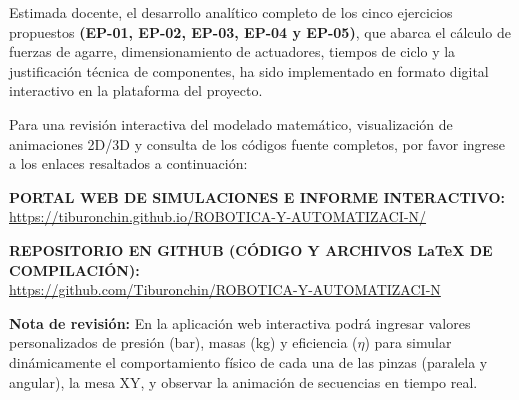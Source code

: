 \documentclass[12pt,a4paper]{article}
\begin{document}
\vspace{0.5cm}

Estimada docente, el desarrollo analítico completo de los cinco ejercicios propuestos \textbf{(EP-01, EP-02, EP-03, EP-04 y EP-05)}, que abarca el cálculo de fuerzas de agarre, dimensionamiento de actuadores, tiempos de ciclo y la justificación técnica de componentes, ha sido implementado en formato digital interactivo en la plataforma del proyecto.

\vspace{0.4cm}

Para una revisión interactiva del modelado matemático, visualización de animaciones 2D/3D y consulta de los códigos fuente completos, por favor ingrese a los enlaces resaltados a continuación:

\vspace{1cm}

\begin{center}
    \setlength{\fboxsep}{12pt}
    \colorbox[HTML]{EFF6FF}{
        \begin{minipage}{0.9\textwidth}
            \centering
            \vspace{0.2cm}
            \textbf{PORTAL WEB DE SIMULACIONES E INFORME INTERACTIVO:} \\
            \vspace{0.2cm}
            \url{https://tiburonchin.github.io/ROBOTICA-Y-AUTOMATIZACI-N/} \\
            
            \vspace{0.8cm}
            
            \textbf{REPOSITORIO EN GITHUB (CÓDIGO Y ARCHIVOS LaTeX DE COMPILACIÓN):} \\
            \vspace{0.2cm}
            \url{https://github.com/Tiburonchin/ROBOTICA-Y-AUTOMATIZACI-N}
            \vspace{0.2cm}
        \end{minipage}
    }
\end{center}

\vspace{1.5cm}

\noindent \textbf{Nota de revisión:} En la aplicación web interactiva podrá ingresar valores personalizados de presión (bar), masas (kg) y eficiencia ($\eta$) para simular dinámicamente el comportamiento físico de cada una de las pinzas (paralela y angular), la mesa XY, y observar la animación de secuencias en tiempo real.
\end{document}
